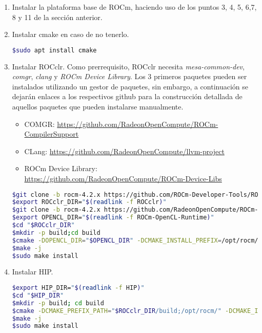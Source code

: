 \begin{enumerate}
\item Instalar la plataforma base de ROCm, haciendo uso de los puntos 3, 4, 5, 6,7, 8 y 11 de la sección anterior.

\item Instalar cmake en caso de no tenerlo.

\begin{lstlisting}[language=bash]
$sudo apt install cmake
\end{lstlisting}

\item Instalar ROCclr.
Como prerrequisito, ROCclr necesita \textit{mesa-common-dev}, \textit{comgr}, \textit{clang} y \textit{ROCm Device Library}.
Los 3 primeros paquetes pueden ser instalados utilizando un gestor de paquetes, sin embargo, a continuación se dejarán enlaces a los respectivos github para la construcción detallada de aquellos paquetes que pueden instalarse manualmente.
\begin{itemize}
    \item COMGR: \hyperlink{https://github.com/RadeonOpenCompute/ROCm-CompilerSupport}{https://github.com/RadeonOpenCompute/ROCm-CompilerSupport}
    \item CLang: \hyperlink{https://github.com/RadeonOpenCompute/llvm-project}{https://github.com/RadeonOpenCompute/llvm-project}
    \item ROCm Device Library: \hyperlink{https://github.com/RadeonOpenCompute/ROCm-Device-Libs}{https://github.com/RadeonOpenCompute/ROCm-Device-Libs}
\end{itemize}
\begin{lstlisting}[language=bash, breaklines=true]
$git clone -b rocm-4.2.x https://github.com/ROCm-Developer-Tools/ROCclr.git
$export ROCclr_DIR="$(readlink -f ROCclr)"
$git clone -b rocm-4.2.x https://github.com/RadeonOpenCompute/ROCm-OpenCL-Runtime.git
$export OPENCL_DIR="$(readlink -f ROCm-OpenCL-Runtime)"
$cd "$ROCclr_DIR"
$mkdir -p build;cd build
$cmake -DOPENCL_DIR="$OPENCL_DIR" -DCMAKE_INSTALL_PREFIX=/opt/rocm/rocclr ..
$make -j
$sudo make install
\end{lstlisting}
\item Instalar HIP.
\begin{lstlisting}[language=bash, breaklines=true]
$export HIP_DIR="$(readlink -f HIP)"
$cd "$HIP_DIR"
$mkdir -p build; cd build
$cmake -DCMAKE_PREFIX_PATH="$ROCclr_DIR/build;/opt/rocm/" -DCMAKE_INSTALL_PREFIX=</where/to/install/hip> ..
$make -j
$sudo make install
\end{lstlisting}


\end{enumerate}
